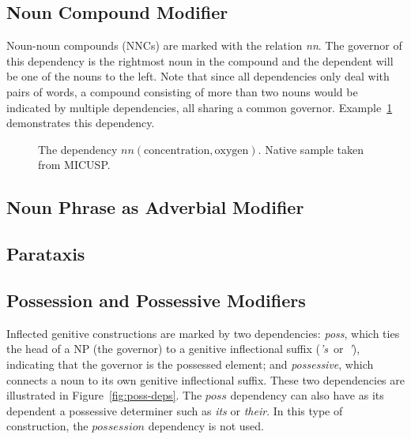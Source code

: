 \documentclass[main.tex]{subfiles}
\begin{document}
\subsection{Noun Compound Modifier}

Noun-noun compounds (NNCs) are marked with the relation \textit{nn}. The governor of this dependency is the rightmost noun in the compound and the dependent will be one of the nouns to the left. Note that since all dependencies only deal with pairs of words, a compound consisting of more than two nouns would be indicated by multiple dependencies, all sharing a common governor. Example~\ref{fig:nn-deps} demonstrates this dependency. 

\begin{figure}[htbp]
\caption{The dependency $nn(\text{concentration}, \text{oxygen})$. Native sample taken from MICUSP.}
\centering
{}
\label{fig:nn-deps}
\end{figure}

\subsection{Noun Phrase as Adverbial Modifier}



\subsection{Parataxis}
\subsection{Possession and Possessive Modifiers}

Inflected genitive constructions are marked by two dependencies: \textit{poss}, which ties the head of a NP (the governor) to a genitive inflectional suffix (\textit{'s}~or~\textit{'}), indicating that the governor is the possessed element; and \textit{possessive}, which connects a noun to its own genitive inflectional suffix. These two dependencies are illustrated in Figure~\ref{fig:poss-deps}. The $poss$ dependency can also have as its dependent a possessive determiner such as \textit{its} or \textit{their}. In this type of construction, the $possession$ dependency is not used. 
\end{document}
